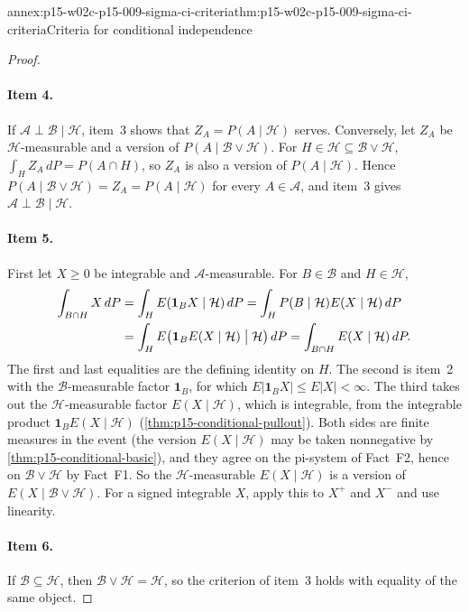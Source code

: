 \begin{annexitem}{annex:p15-w02c-p15-009-sigma-ci-criteria}{thm:p15-w02c-p15-009-sigma-ci-criteria}{Criteria for conditional independence}
\begin{proof}
\paragraph{Item 4.} If \(\mathcal A\perp\mathcal B\mid\mathcal H\), item~3
shows that \(Z_A=P(A\mid\mathcal H)\) serves. Conversely, let \(Z_A\) be
\(\mathcal H\)-measurable and a version of \(P(A\mid\mathcal B\vee\mathcal H)\).
For \(H\in\mathcal H\subseteq\mathcal B\vee\mathcal H\),
\(\int_HZ_A\,dP=P(A\cap H)\), so \(Z_A\) is also a version of
\(P(A\mid\mathcal H)\). Hence
\(P(A\mid\mathcal B\vee\mathcal H)=Z_A=P(A\mid\mathcal H)\) for every
\(A\in\mathcal A\), and item~3 gives \(\mathcal A\perp\mathcal B\mid\mathcal H\).

\paragraph{Item 5.} First let \(X\geq0\) be integrable and
\(\mathcal A\)-measurable. For \(B\in\mathcal B\) and \(H\in\mathcal H\),
\[
\begin{aligned}
 \int_{B\cap H}X\,dP&=\int_HE(\mathbf1_BX\mid\mathcal H)\,dP
 =\int_HP(B\mid\mathcal H)E(X\mid\mathcal H)\,dP\\
 &=\int_HE\bigl(\mathbf1_BE(X\mid\mathcal H)\bigm|\mathcal H\bigr)\,dP
 =\int_{B\cap H}E(X\mid\mathcal H)\,dP .
\end{aligned}
\]
The first and last equalities are the defining identity on \(H\). The
second is item~2 with the \(\mathcal B\)-measurable factor \(\mathbf1_B\),
for which \(E|\mathbf1_BX|\leq E|X|<\infty\). The third takes out the
\(\mathcal H\)-measurable factor \(E(X\mid\mathcal H)\), which is
integrable, from the integrable product \(\mathbf1_BE(X\mid\mathcal H)\)
(\cref{thm:p15-conditional-pullout}). Both sides are finite measures in the
event (the version \(E(X\mid\mathcal H)\) may be taken nonnegative by
\cref{thm:p15-conditional-basic}), and they agree on the pi-system of
Fact~F2, hence on \(\mathcal B\vee\mathcal H\) by Fact~F1. So the
\(\mathcal H\)-measurable \(E(X\mid\mathcal H)\) is a version of
\(E(X\mid\mathcal B\vee\mathcal H)\). For a signed integrable \(X\), apply
this to \(X^+\) and \(X^-\) and use linearity.

\paragraph{Item 6.} If \(\mathcal B\subseteq\mathcal H\), then
\(\mathcal B\vee\mathcal H=\mathcal H\), so the criterion of item~3 holds
with equality of the same object.


\end{proof}
\end{annexitem}
